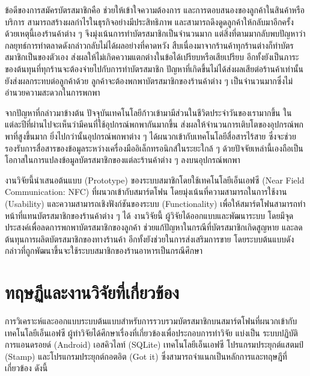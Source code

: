 \documentclass[12pt,a4paper,twocolumn]{article}
\begin{document}
ข้อดีของการสมัครบัตรสมาชิกคือ ช่วยให้เข้าใจความต้องการ และการตอบสนองของลูกค้าในสินค้าหรือบริการ สามารถสร้างผลกําไรในธุรกิจอย่างมีประสิทธิภาพ และสามารถดึงดูดลูกค้าให้กลับมาอีกครั้ง ด้วยเหตุนี้เองร้านค้าต่าง ๆ จึงมุ่งเน้นการทำบัตรสมาชิกเป็นจำนวนมาก แต่สิ่งที่ตามมากลับพบปัญหาว่ากลยุทธ์การทำตลาดดังกล่าวกลับไม่ได้ผลอย่างที่คาดหวัง สืบเนื่องมาจากร้านค้าทุกร้านต่างก็ทำบัตรสมาชิกเป็นของตัวเอง ส่งผลให้ไม่เกิดความแตกต่างในข้อได้เปรียบหรือเสียเปรียบ อีกทั้งยังเป็นภาระของต้นทุนที่ทุกร้านจะต้องจ่ายไปกับการทำบัตรสมาชิก ปัญหาที่เกิดขึ้นไม่ได้ส่งผลเสียต่อร้านค้าเท่านั้น  ยังส่งผลกระทบต่อลูกค้าด้วย ลูกค้าจะต้องพกพาบัตรสมาชิกของร้านค้าต่าง ๆ เป็นจำนวนมากซึ่งไม่อำนวยความสะดวกในการพกพา

จากปัญหาที่กล่าวมาข้างต้น ปัจจุบันเทคโนโลยีก้าวเข้ามามีส่วนในชีวิตประจำวันของเรามากขึ้น ในแต่ละปีที่ผ่านไปจะเห็นว่ามีคนที่ใช้อุปกรณ์พกพากันมากขึ้น ส่งผลให้จำนวนการเติบโตของอุปกรณ์พกพาที่สูงขึ้นมาก \cite{itm:shopping} ยิ่งไปกว่านั้นอุปกรณ์พกพาต่าง ๆ ได้ผนวกเข้ากับเทคโนโลยีสื่อสารไร้สาย ซึ่งจะช่วยรองรับการสื่อสารของข้อมูลระหว่างเครื่องมืออิเล็กทรอนิกส์ในระยะใกล้ ๆ \cite{itm:rpp-mobile} ด้วยปัจจัยเหล่านี้เองถือเป็นโอกาสในการแปลงข้อมูลบัตรสมาชิกของแต่ละร้านค้าต่าง ๆ ลงบนอุปกรณ์พกพา 

งานวิจัยนี้นำเสนอต้นแบบ (Prototype) ของระบบสมาชิกโดยใช้เทคโนโลยีเอ็นเอฟซี (Near Field Communication: NFC) ที่ผนวกเข้ากับสมาร์ตโฟน โดยมุ่งเน้นที่ความสามารถในการใช้งาน (Usability) และความสามารถเชิงฟังก์ชันของระบบ (Functionality) เพื่อให้สมาร์ตโฟนสามารถทำหน้าที่แทนบัตรสมาชิกของร้านค้าต่าง ๆ ได้ งานวิจัยนี้ ผู้วิจัยได้ออกแบบและพัฒนาระบบ โดยมีจุดประสงค์เพื่อลดการพกพาบัตรสมาชิกของลูกค้า ช่วยแก้ปัญหาในกรณีที่บัตรสมาชิกเกิดสูญหาย และลดต้นทุนการผลิตบัตรสมาชิกของทางร้านค้า อีกทั้งยังช่วยในการส่งเสริมการขาย โดยระบบต้นแบบดังกล่าวที่ถูกพัฒนาขึ้นจะใช้ระบบสมาชิกของร้านอาหารเป็นกรณีศึกษา


\section{ทฤษฏีและงานวิจัยที่เกี่ยวข้อง}
การวิเคราะห์และออกแบบระบบต้นแบบสำหรับการรวบรวมบัตรสมาชิกบนสมาร์ตโฟนที่ผนวกเข้ากับเทคโนโลยีเอ็นเอฟซี ผู้ทำวิจัยได้ศึกษาเรื่องที่เกี่ยวข้องเพื่อประกอบการทําวิจัย แบ่งเป็น ระบบปฏิบัติการแอนดรอยด์ (Android) เอสคิวไลท์ (SQLite) เทคโนโลยีเอ็นเอฟซี โปรแกรมประยุกต์แสตมป์ (Stamp) และโปรแกรมประยุกต์กอตอิต (Got it) ซึ่งสามารถจําแนกเป็นหลักการและทฤษฎีที่เกี่ยวข้อง ดังนี้
\end{document}
